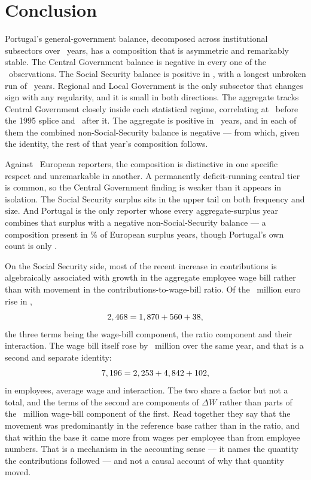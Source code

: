 
\section{Conclusion}
\label{sec:conclusion}

Portugal's general-government balance, decomposed across institutional subsectors
over \PanelYears\ years, has a composition that is asymmetric and remarkably stable.
The Central Government balance is negative in every one of the
\CentralNegativeYears\ observations. The Social Security balance is positive in
\SsfPositiveYears, with a longest unbroken run of \SsfLongestPositiveRun\ years.
Regional and Local Government is the only subsector that changes sign with any
regularity, and it is small in both directions. The aggregate tracks Central
Government closely inside each statistical regime, correlating at
\HistoricalTrackingCorrelation\ before the 1995 splice and \ModernTrackingCorrelation\
after it. The aggregate is positive
in \NumPositiveYears\ years, and in each of them the combined non-Social-Security
balance is negative --- from which, given the identity, the rest of that year's
composition follows.

Against \BenchmarkCountries\ European reporters, the composition is distinctive in one
specific respect and unremarkable in another. A permanently deficit-running central
tier is common, so the Central Government finding is weaker than it appears in
isolation. The Social Security surplus sits in the upper tail on both frequency and
size. And Portugal is the only reporter whose every aggregate-surplus year combines
that surplus with a negative non-Social-Security balance --- a composition present in
\SurplusOffsettingShare\% of European surplus years, though Portugal's own count is
only \PtSurplusYears.

On the Social Security side, most of the recent increase in contributions is
algebraically associated with growth in the aggregate employee wage bill rather than with
movement in the contributions-to-wage-bill ratio. Of the \BaseContributionsChange\ million
euro rise in \BaseYear,
\[
2,468 = 1,870 + 560 + 38,
\]
the three terms being the wage-bill component, the ratio component and their interaction.
The wage bill itself rose by \BaseWageBillChange\ million over the same year, and that is
a second and separate identity:
\[
7,196 = 2,253 + 4,842 + 102,
\]
in employees, average wage and interaction. The two share a factor but not a total, and
the terms of the second are components of $\Delta W$ rather than parts of the
\BaseFromWageBill\ million wage-bill component of the first. Read together they say that
the movement was predominantly in the reference base rather than in the ratio, and that
within the base it came more from wages per employee than from employee numbers. That is
a mechanism in the accounting sense --- it names the quantity the contributions followed
--- and not a causal account of why that quantity moved.

